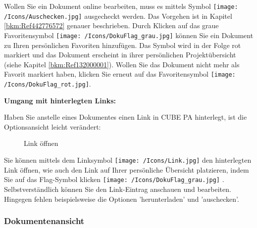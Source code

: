 Wollen Sie ein Dokument online bearbeiten, muss es mittels Symbol \texttt{[image: /Icons/Auschecken.jpg]}  ausgecheckt werden. Das Vorgehen ist in Kapitel \ref{bkm:Ref442776572} genauer beschrieben. Durch Klicken auf das graue Favoritensymbol \texttt{[image: /Icons/DokuFlag\_grau.jpg]}  können Sie ein Dokument zu Ihren persönlichen Favoriten hinzufügen. Das Symbol wird in der Folge rot markiert und das Dokument erscheint in ihrer persönlichen Projektübersicht (siehe Kapitel \ref{bkm:Ref132000001}). Wollen Sie das Dokument nicht mehr als Favorit markiert haben, klicken Sie erneut auf das Favoritensymbol \texttt{[image: /Icons/DokuFlag\_rot.jpg]}. \newline


\textbf{Umgang mit hinterlegten Links:}

Haben Sie anstelle eines Dokumentes einen Link in CUBE PA hinterlegt, ist die Optionsansicht leicht verändert:

\begin{figure}[H]
\caption{Link öffnen}
\end{figure}

Sie können mittels dem Linksymbol \texttt{[image: /Icons/Link.jpg]}  den hinterlegten Link öffnen, wie auch den Link auf Ihrer persönliche Übersicht platzieren, indem Sie auf das Flag-Symbol klicken \texttt{[image: /Icons/DokuFlag\_grau.jpg]} . Selbstverständlich können Sie den Link-Eintrag anschauen und bearbeiten. Hingegen fehlen beispielsweise die Optionen 'herunterladen' und 'auschecken'.


\pagebreak
\subsubsection{Dokumentenansicht}
\label{bkm:Ref443047930}

